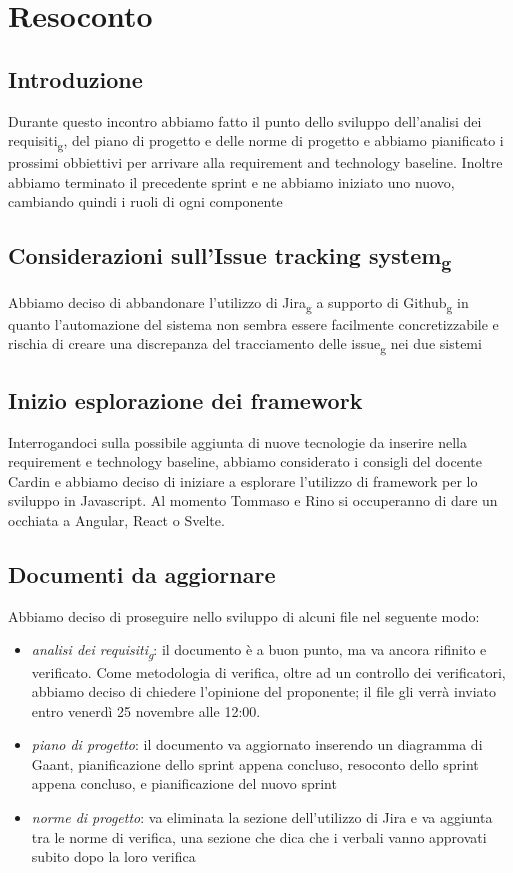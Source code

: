 \section{Resoconto}
\subsection{Introduzione}
Durante questo incontro abbiamo fatto il punto dello sviluppo dell'analisi dei requisiti\textsubscript{g}, del piano di progetto e delle norme di progetto e abbiamo pianificato i prossimi obbiettivi per arrivare alla requirement and technology baseline. Inoltre abbiamo terminato il precedente sprint e ne abbiamo iniziato uno nuovo, cambiando quindi i ruoli di ogni componente

\subsection{Considerazioni sull'Issue tracking system\textsubscript{g}}
Abbiamo deciso di abbandonare l'utilizzo di Jira\textsubscript{g} a supporto di Github\textsubscript{g} in quanto l'automazione del sistema non sembra essere facilmente concretizzabile e rischia di creare una discrepanza del tracciamento delle issue\textsubscript{g} nei due sistemi

\subsection{Inizio esplorazione dei framework}
Interrogandoci sulla possibile aggiunta di nuove tecnologie da inserire nella requirement e technology baseline, abbiamo considerato i consigli del docente Cardin e abbiamo deciso di iniziare a esplorare l'utilizzo di framework per lo sviluppo in Javascript. Al momento Tommaso e Rino si occuperanno di dare un occhiata a Angular, React o Svelte.


\subsection{Documenti da aggiornare}
Abbiamo deciso di proseguire nello sviluppo di alcuni file nel seguente modo:
\begin{itemize}
	\item \textit{analisi dei requisiti\textsubscript{g}}: il documento è a buon punto, ma va ancora rifinito e verificato. Come metodologia di verifica, oltre ad un controllo dei verificatori, abbiamo deciso di chiedere l'opinione del proponente; il file gli verrà inviato entro venerdì 25 novembre alle 12:00.
	\item \textit{piano di progetto}: il documento va aggiornato inserendo un diagramma di Gaant, pianificazione dello sprint appena concluso, resoconto dello sprint appena concluso, e pianificazione del nuovo sprint
	\item \textit{norme di progetto}: va eliminata la sezione dell'utilizzo di Jira e va aggiunta tra le norme di verifica, una sezione che dica che i verbali vanno approvati subito dopo la loro verifica
\end{itemize}

